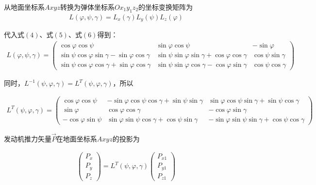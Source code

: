 \documentclass[UTF8]{ctexart}
\begin{document}

从地面坐标系$Axyz$转换为弹体坐标系$Ox_{1}y_{1}z_{2}$的坐标变换矩阵为
\begin{align}
    L \left(\varphi , \psi , \gamma\right)
    =
    L_{x} \left(\gamma\right)
    L_{y} \left(\psi\right)
    L_{z} \left(\varphi\right)
\end{align}

代入式$\left(4\right)$、式$\left(5\right)$、式$\left(6\right)$得到：
\begin{align}
    L \left(\varphi , \psi , \gamma\right)
    =
    \begin{pmatrix}
        \cos\varphi\cos\psi                                 & \sin\varphi\cos\psi                                 & -\sin\varphi
        \\
        \sin\psi\cos\varphi\sin\gamma-\sin\varphi\cos\gamma & \sin\psi\sin\varphi\sin\gamma+\cos\varphi\cos\gamma & \cos\psi\sin\gamma
        \\
        \sin\psi\cos\varphi\cos\gamma+\sin\varphi\cos\gamma & \sin\psi\sin\varphi\cos\gamma-\cos\varphi\sin\gamma & \cos\psi\cos\gamma
    \end{pmatrix}
\end{align}

同时，$L^{-1} \left(\psi , \varphi , \gamma\right) = L^{T} \left(\psi , \varphi , \gamma\right)$，所以

\begin{align}
    L^{T} \left(\psi , \varphi , \gamma\right)
    =
    \begin{pmatrix}
        \cos\varphi\cos\psi  & -\sin\varphi\cos\psi\cos\gamma+\sin\psi\sin\gamma & \sin\varphi\cos\psi\sin\gamma+\sin\psi\cos\gamma
        \\
        \sin\varphi          & \cos\varphi\cos\gamma                             & -\cos\varphi\sin\gamma
        \\
        -\cos\varphi\sin\psi & \sin\varphi\sin\psi\cos\gamma+\cos\psi\sin\gamma  & -\sin\varphi\sin\psi\sin\gamma+\cos\psi\cos\gamma
    \end{pmatrix}
\end{align}

发动机推力矢量$\vec{P}$在地面坐标系$Axyz$的投影为

\begin{align}
    \begin{pmatrix}
        P_{x} \\
        P_{y} \\
        P_{z}
    \end{pmatrix}
    =
    L^{T} \left(\psi , \varphi , \gamma\right)
    \begin{pmatrix}
        P_{x1} \\
        P_{y1} \\
        P_{z1}
    \end{pmatrix}
\end{align}
\end{document}

